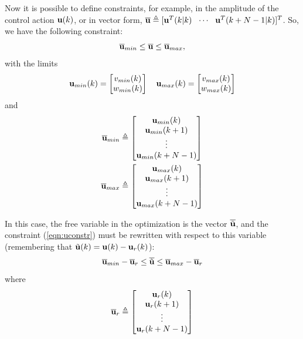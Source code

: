 \documentclass[twocolumn]{IEEEtran} %
\begin{document}
Now it is possible to define constraints, for example, in the amplitude of the control action ${\bf u}(k)$, or in vector form, $\overline {\bf u}\triangleq[{\bf u}^T(k|k)~~\cdots~~{\bf u}^T(k+N-1|k)]^T$. So, we have the following constraint:
\begin{equation}\label{eqn:uconstr}
	\overline{\bf u}_{min} \leq \overline{\bf u} \leq \overline{\bf u}_{max},
\end{equation}
with the limits 
\begin{equation*}
	{\bf u}_{min}(k) = \begin{bmatrix}
		v_{min}(k) \\ w_{min}(k)
	\end{bmatrix} \quad 
	{\bf u}_{max}(k) = \begin{bmatrix}
		v_{max}(k) \\ w_{max}(k)
	\end{bmatrix}
\end{equation*}
and
\begin{align*}
	\overline{\bf u}_{min} &\triangleq \begin{bmatrix}
		{\bf u}_{min}(k) \\ {\bf u}_{min}(k+1) \\ \vdots \\ {\bf u}_{min}(k+N-1)
	\end{bmatrix} \\
	\overline{\bf u}_{max} &\triangleq \begin{bmatrix}
		{\bf u}_{max}(k) \\ {\bf u}_{max}(k+1) \\ \vdots \\ {\bf u}_{max}(k+N-1)
	\end{bmatrix}
\end{align*}

In this case, the free variable in the optimization is the vector $\overline{\tilde{\bf u}}$, and the constraint (\ref{eqn:uconstr}) must be rewritten with respect to this variable (remembering that $\tilde{\bf u}(k)={\bf u}(k)-{\bf u}_r(k)$):
\begin{equation*}
	\overline{\bf u}_{min} - \overline{\bf u}_r \leq \overline{\tilde{\bf u}} \leq \overline{\bf u}_{max} - \overline{\bf u}_r
\end{equation*}
where
\begin{equation*}
	\overline{\bf u}_r \triangleq \begin{bmatrix}
		{\bf u}_r(k) \\ {\bf u}_r(k+1) \\ \vdots \\ {\bf u}_r(k+N-1)
	\end{bmatrix}
\end{equation*}
\end{document}
